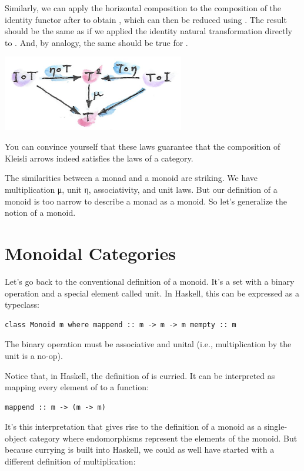 Similarly, we can apply the horizontal composition  to the
composition of the identity functor  after  to
obtain , which can then be reduced using . The
result should be the same as if we applied the identity natural
transformation directly to . And, by analogy, the same should
be true for .

\includegraphics[width=3.12500in]{images/unitlawcomp-1.png}

You can convince yourself that these laws guarantee that the composition
of Kleisli arrows indeed satisfies the laws of a category.

The similarities between a monad and a monoid are striking. We have
multiplication μ, unit η, associativity, and unit laws. But our
definition of a monoid is too narrow to describe a monad as a monoid. So
let's generalize the notion of a monoid.

\section{Monoidal Categories}\label{monoidal-categories}

Let's go back to the conventional definition of a monoid. It's a set
with a binary operation and a special element called unit. In Haskell,
this can be expressed as a typeclass:

\begin{verbatim}
class Monoid m where mappend :: m -> m -> m mempty :: m
\end{verbatim}

The binary operation  must be associative and unital
(i.e., multiplication by the unit  is a no-op).

Notice that, in Haskell, the definition of  is curried.
It can be interpreted as mapping every element of  to a
function:

\begin{verbatim}
mappend :: m -> (m -> m)
\end{verbatim}

It's this interpretation that gives rise to the definition of a monoid
as a single-object category where endomorphisms
 represent the elements of the monoid.
But because currying is built into Haskell, we could as well have
started with a different definition of multiplication:


